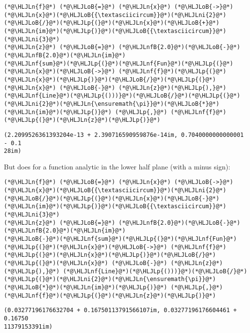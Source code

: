 \documentclass[12pt,landscape]{article}
\newcommand{\HLJLn}[1]{#1}
\newcommand{\HLJLnf}[1]{\textcolor[RGB]{66,102,213}{#1}}
\newcommand{\HLJLnfB}[1]{\textcolor[RGB]{59,151,46}{#1}}
\newcommand{\HLJLni}[1]{\textcolor[RGB]{59,151,46}{#1}}
\newcommand{\HLJLoB}[1]{\textcolor[RGB]{102,102,102}{\textbf{#1}}}
\newcommand{\HLJLp}[1]{#1}
\begin{document}
{\begin{lstlisting}
(*@\HLJLn{f}@*) (*@\HLJLoB{=}@*) (*@\HLJLn{x}@*) (*@\HLJLoB{->}@*) (*@\HLJLn{x}@*)(*@\HLJLoB{{\textasciicircum}}@*)(*@\HLJLni{2}@*)(*@\HLJLoB{/}@*)(*@\HLJLp{(}@*)(*@\HLJLn{x}@*)(*@\HLJLoB{+}@*)(*@\HLJLn{im}@*)(*@\HLJLp{)}@*)(*@\HLJLoB{{\textasciicircum}}@*)(*@\HLJLni{3}@*)
(*@\HLJLn{z}@*) (*@\HLJLoB{=}@*) (*@\HLJLnfB{2.0}@*)(*@\HLJLoB{-}@*)(*@\HLJLnfB{2.0}@*)(*@\HLJLn{im}@*)
(*@\HLJLnf{sum}@*)(*@\HLJLp{(}@*)(*@\HLJLnf{Fun}@*)(*@\HLJLp{(}@*)(*@\HLJLn{x}@*)(*@\HLJLoB{->}@*) (*@\HLJLnf{f}@*)(*@\HLJLp{(}@*)(*@\HLJLn{x}@*)(*@\HLJLp{)}@*)(*@\HLJLoB{/}@*)(*@\HLJLp{(}@*)(*@\HLJLn{x}@*) (*@\HLJLoB{-}@*) (*@\HLJLn{z}@*)(*@\HLJLp{),}@*) (*@\HLJLnf{Line}@*)(*@\HLJLp{()))}@*)(*@\HLJLoB{/}@*)(*@\HLJLp{(}@*)(*@\HLJLni{2}@*)(*@\HLJLn{\ensuremath{\pi}}@*)(*@\HLJLoB{*}@*)(*@\HLJLn{im}@*)(*@\HLJLp{)}@*) (*@\HLJLp{,}@*) (*@\HLJLnf{f}@*)(*@\HLJLp{(}@*)(*@\HLJLn{z}@*)(*@\HLJLp{)}@*)
\end{lstlisting}

\begin{lstlisting}
(2.2099526361393204e-13 + 2.390716590959876e-14im, 0.7040000000000001 - 0.1
28im)
\end{lstlisting}


But does for a function analytic in the lower half plane (with a minus sign):


\begin{lstlisting}
(*@\HLJLn{f}@*) (*@\HLJLoB{=}@*) (*@\HLJLn{x}@*) (*@\HLJLoB{->}@*) (*@\HLJLn{x}@*)(*@\HLJLoB{{\textasciicircum}}@*)(*@\HLJLni{2}@*)(*@\HLJLoB{/}@*)(*@\HLJLp{(}@*)(*@\HLJLn{x}@*)(*@\HLJLoB{-}@*)(*@\HLJLn{im}@*)(*@\HLJLp{)}@*)(*@\HLJLoB{{\textasciicircum}}@*)(*@\HLJLni{3}@*)
(*@\HLJLn{z}@*) (*@\HLJLoB{=}@*) (*@\HLJLnfB{2.0}@*)(*@\HLJLoB{-}@*)(*@\HLJLnfB{2.0}@*)(*@\HLJLn{im}@*)
(*@\HLJLoB{-}@*)(*@\HLJLnf{sum}@*)(*@\HLJLp{(}@*)(*@\HLJLnf{Fun}@*)(*@\HLJLp{(}@*)(*@\HLJLn{x}@*)(*@\HLJLoB{->}@*) (*@\HLJLnf{f}@*)(*@\HLJLp{(}@*)(*@\HLJLn{x}@*)(*@\HLJLp{)}@*)(*@\HLJLoB{/}@*)(*@\HLJLp{(}@*)(*@\HLJLn{x}@*) (*@\HLJLoB{-}@*) (*@\HLJLn{z}@*)(*@\HLJLp{),}@*) (*@\HLJLnf{Line}@*)(*@\HLJLp{()))}@*)(*@\HLJLoB{/}@*)(*@\HLJLp{(}@*)(*@\HLJLni{2}@*)(*@\HLJLn{\ensuremath{\pi}}@*)(*@\HLJLoB{*}@*)(*@\HLJLn{im}@*)(*@\HLJLp{)}@*) (*@\HLJLp{,}@*) (*@\HLJLnf{f}@*)(*@\HLJLp{(}@*)(*@\HLJLn{z}@*)(*@\HLJLp{)}@*)
\end{lstlisting}

\begin{lstlisting}
(0.03277196176632704 + 0.16750113791566107im, 0.03277196176604461 + 0.16750
11379153391im)
\end{lstlisting}


}
\end{document}
